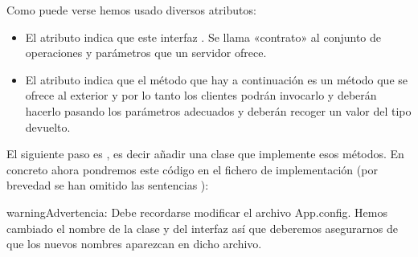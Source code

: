 \documentclass[letterpaper,10pt,spanish]{sphinxmanual}
\begin{document}
Como puede verse hemos usado diversos atributos:
\begin{itemize}
\item {} 
El atributo \sphinxcode{\sphinxupquote{{[}ServiceContract{]}}} indica que este interfaz . Se llama «contrato» al conjunto de operaciones y parámetros que un servidor ofrece.

\item {} 
El atributo \sphinxcode{\sphinxupquote{{[}OperationContract{]}}} indica que el método que hay a continuación es un método que se ofrece al exterior y por lo tanto los clientes podrán invocarlo y deberán hacerlo pasando los parámetros adecuados y deberán recoger un valor del tipo devuelto.

\end{itemize}

El siguiente paso es , es decir añadir una clase que implemente esos métodos. En concreto ahora pondremos este código en el fichero de implementación  (por brevedad se han omitido las sentencias ):

\begin{sphinxVerbatim}[commandchars=\\\{\}]
 
        
           
            \PYG{p}{[}\PYG{p}{]}   
              

           
             
\end{sphinxVerbatim}

\begin{sphinxadmonition}{warning}{Advertencia:}
Debe recordarse modificar el archivo App.config. Hemos cambiado el nombre de la clase y del interfaz así que deberemos asegurarnos de que los nuevos nombres aparezcan en dicho archivo.
\end{sphinxadmonition}
\end{document}
